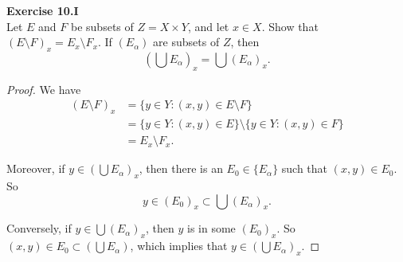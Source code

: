 \documentclass[12pt, a4paper]{article}
\theoremstyle{plain}
\newenvironment{exercise}[2][Exercise]
    { \begin{mdframed}[backgroundcolor=gray!20] \textbf{#1 #2} \\}
    {  \end{mdframed}}
\begin{document}
\begin{exercise}{10.I}
    Let $E$ and $F$ be subsets of $Z=X\times Y$, and let $x\in X$. Show that $(E\setminus F)_x=E_x\setminus F_x$. If $(E_\alpha)$ are subsets of $Z$, then
    \[
    (\bigcup E_\alpha)_x = \bigcup (E_\alpha)_x.
    \]
\end{exercise}
    \begin{proof}
        We have
        \begin{align*}
            (E\setminus F)_x &= \{y\in Y: (x,y)\in E\setminus F\}\\
            &= \{y\in Y:(x,y)\in E\}\setminus\{y\in Y:(x,y)\in F\}\\
            &= E_x\setminus F_x.
        \end{align*}

        Moreover, if $y\in (\bigcup E_\alpha)_x$, then there is an $E_0\in \{E_\alpha\}$ such that $(x,y)\in E_0$. So 
        \[
        y\in (E_0)_x\subset \bigcup (E_\alpha)_x.
        \]
        
        Conversely, if $y\in \bigcup (E_\alpha)_x$, then $y$ is in some $(E_0)_x$. So $(x,y)\in E_0\subset (\bigcup E_\alpha)$, which implies that $y\in (\bigcup E_\alpha)_x$.
    \end{proof}
\end{document}
